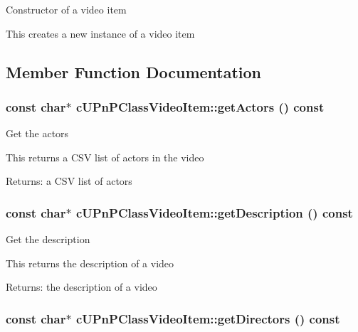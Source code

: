 Constructor of a video item

This creates a new instance of a video item 

\subsection{Member Function Documentation}
\hypertarget{classcUPnPClassVideoItem_61bca560d8469a441894896fe950adf3}{
\subsubsection[{getActors}]{\setlength{\rightskip}{0pt plus 5cm}const char$\ast$ cUPnPClassVideoItem::getActors () const}}
\label{classcUPnPClassVideoItem_61bca560d8469a441894896fe950adf3}


Get the actors

This returns a CSV list of actors in the video

\begin{Desc}
\item[Returns:]a CSV list of actors \end{Desc}
\hypertarget{classcUPnPClassVideoItem_364180a89479d6143cfbe146d337a7dc}{
\subsubsection[{getDescription}]{\setlength{\rightskip}{0pt plus 5cm}const char$\ast$ cUPnPClassVideoItem::getDescription () const}}
\label{classcUPnPClassVideoItem_364180a89479d6143cfbe146d337a7dc}


Get the description

This returns the description of a video

\begin{Desc}
\item[Returns:]the description of a video \end{Desc}
\hypertarget{classcUPnPClassVideoItem_5b24963eb2d6d5d8e1547ba73863e13c}{
\subsubsection[{getDirectors}]{\setlength{\rightskip}{0pt plus 5cm}const char$\ast$ cUPnPClassVideoItem::getDirectors () const}}
\label{classcUPnPClassVideoItem_5b24963eb2d6d5d8e1547ba73863e13c}


